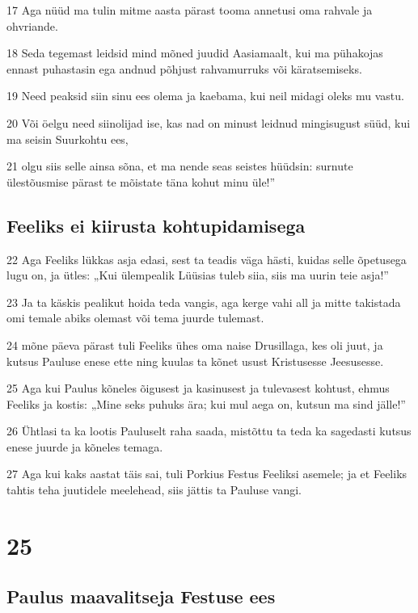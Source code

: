 \par 17 Aga nüüd ma tulin mitme aasta pärast tooma annetusi oma rahvale ja ohvriande.
\par 18 Seda tegemast leidsid mind mõned juudid Aasiamaalt, kui ma pühakojas ennast puhastasin ega andnud põhjust rahvamurruks või käratsemiseks.
\par 19 Need peaksid siin sinu ees olema ja kaebama, kui neil midagi oleks mu vastu.
\par 20 Või öelgu need siinolijad ise, kas nad on minust leidnud mingisugust süüd, kui ma seisin Suurkohtu ees,
\par 21 olgu siis selle ainsa sõna, et ma nende seas seistes hüüdsin: surnute ülestõusmise pärast te mõistate täna kohut minu üle!”

\section*{Feeliks ei kiirusta kohtupidamisega}

\par 22 Aga Feeliks lükkas asja edasi, sest ta teadis väga hästi, kuidas selle õpetusega lugu on, ja ütles: „Kui ülempealik Lüüsias tuleb siia, siis ma uurin teie asja!”
\par 23 Ja ta käskis pealikut hoida teda vangis, aga kerge vahi all ja mitte takistada omi temale abiks olemast või tema juurde tulemast.
\par 24 mõne päeva pärast tuli Feeliks ühes oma naise Drusillaga, kes oli juut, ja kutsus Pauluse enese ette ning kuulas ta kõnet usust Kristusesse Jeesusesse.
\par 25 Aga kui Paulus kõneles õigusest ja kasinusest ja tulevasest kohtust, ehmus Feeliks ja kostis: „Mine seks puhuks ära; kui mul aega on, kutsun ma sind jälle!”
\par 26 Ühtlasi ta ka lootis Pauluselt raha saada, mistõttu ta teda ka sagedasti kutsus enese juurde ja kõneles temaga.
\par 27 Aga kui kaks aastat täis sai, tuli Porkius Festus Feeliksi asemele; ja et Feeliks tahtis teha juutidele meelehead, siis jättis ta Pauluse vangi.

\chapter{25}

\section*{Paulus maavalitseja Festuse ees}


